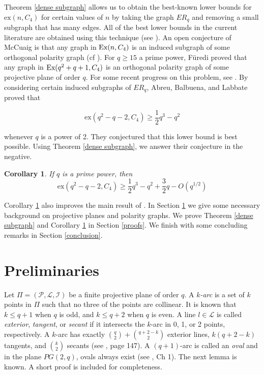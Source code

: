 \documentclass[12pt]{article}
\newtheorem{corollary}[theorem]{Corollary}
\begin{document}
Theorem \ref{dense subgraph} allows us to obtain the best-known lower bounds for $\mathrm{ex}(n, C_4)$ for certain values of $n$ by taking the graph $ER_q$ and removing a small subgraph that has many edges.  All of the best lower bounds in the current literature are obtained using this technique (see \cite{abl, fknw, tt}).  An open conjecture of McCuaig is that
any graph in $\textup{Ex}(n , C_4)$ is an induced subgraph of some orthogonal polarity graph (cf \cite{fu1994}).  For $q \geq 15$ a prime power, F\"{u}redi \cite{fu1996} proved that any graph in $\textup{Ex}( q^2 + q + 1 , C_4)$ is an orthogonal polarity graph of some projective plane of order $q$.  For some recent progress on this problem, see \cite{fknw}.
By considering certain induced subgraphs of $ER_q$, Abreu, Balbuena, and Labbate \cite{abl} proved that

$$ \mathrm{ex}(q^2-q-2, C_4) \geq \frac{1}{2}q^3 - q^2 $$

whenever $q$ is a power of 2.  They conjectured that this lower bound is best possible.
Using Theorem \ref{dense subgraph}, we answer their conjecture in the negative.

\begin{corollary}\label{abl conjecture}
    If $q$ is a prime power, then
    $$ \mathrm{ex}(q^2 - q - 2, C_4) \geq \frac{1}{2}q^3 - q^2 + \frac{3}{2}q - O\left(q^{1/2}\right) $$
\end{corollary}

Corollary \ref{abl conjecture} also improves the main result of \cite{tt}.
In Section \ref{preliminaries} we give some necessary background on projective planes and polarity graphs. We prove
Theorem \ref{dense subgraph} and Corollary \ref{abl conjecture} in Section \ref{proofs}.  We finish with some concluding remarks in Section \ref{conclusion}.

\section{Preliminaries}\label{preliminaries}

Let $\Pi = ( \mathcal{P} , \mathcal{L} , \mathcal{I} )$ be a finite projective plane of order $q$.  A {\em $k$-arc} is a set of $k$ points
in $\Pi$ such that no three of the points are collinear.  It is known that $k \leq q +1$ when $q$ is odd, and $k \leq q + 2$ when $q$ is even.  A line $l \in \mathcal{L}$ is called {\em exterior}, {\em tangent}, or {\em secant} if it intersects the $k$-arc in 0, 1, or 2 points, respectively.  A $k$-arc has exactly $\binom{q}{2} + \binom{q + 2 - k }{2}$ exterior lines, $k ( q+ 2 - k )$ tangents, and $\binom{k}{2}$ secants (see \cite{demb}, page 147).  A $(q+1)$-arc is called an {\em oval} and in the plane $PG(2,q)$, ovals always exist (see \cite{demb}, Ch 1).  The next lemma is known.  A short proof is included for completeness.
\end{document}
